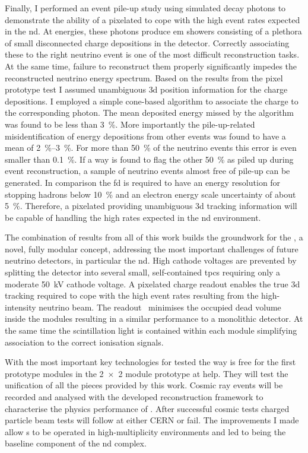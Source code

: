 Finally, I performed an event pile-up study using simulated \Pgpz decay photons to demonstrate the ability of a pixelated \lartpc{} to cope with the high event rates expected in the \dune{} \gls{nd}.
At \dune{} energies, these photons produce \gls{em} showers consisting of a plethora of small disconnected charge depositions in the detector.
Correctly associating these to the right neutrino event is one of the most difficult reconstruction tasks.
At the same time, failure to reconstruct them properly significantly impedes the reconstructed neutrino energy spectrum.
Based on the results from the pixel prototype test I assumed unambiguous \gls{3d} position information for the charge depositions.
I employed a simple cone-based algorithm to associate the charge to the corresponding photon.
The mean deposited energy missed by the algorithm was found to be less than \SI{3}{\percent}.
More importantly the pile-up-related misidentification of energy depositions from other events was found to have a mean of \SIrange{2}{3}{\percent}.
For more than \SI{50}{\percent} of the neutrino events this error is even smaller than \SI{0.1}{\percent}.
If a way is found to flag the other \SI{50}{\percent} as piled up during event reconstruction, a sample of neutrino events almost free of pile-up can be generated.
In comparison the \gls{fd} is required to have an energy resolution for stopping hadrons below \SI{10}{\percent} and an electron energy scale uncertainty of about \SI{5}{\percent}.
Therefore, a pixelated \lartpc{} providing unambiguous \gls{3d} tracking information will be capable of handling the high rates expected in the \dune{} \gls{nd} environment.

The combination of results from all of this work builds the groundwork for the \AC{}, a novel, fully modular \lartpc{} concept, addressing the most important challenges of future neutrino detectors, in particular the \dune{} \gls{nd}.
High cathode voltages are prevented by splitting the detector into several small, self-contained \glspl{tpc} requiring only a moderate \SI{50}{\kilo\volt} cathode voltage.
A pixelated charge readout enables the true \gls{3d} tracking required to cope with the high event rates resulting from the high-intensity neutrino beam.
The \AL{} readout~\cite{arclight} minimises the occupied dead volume inside the modules resulting in a similar performance to a monolithic detector.
At the same time the scintillation light is contained within each module simplifying association to the correct ionisation signals.

With the most important key technologies for \AC{} tested the way is free for the first prototype modules in the \num{2 x 2} module prototype at \gls{help}.
They will test the unification of all the pieces provided by this work.
Cosmic ray events will be recorded and analysed with the developed reconstruction framework to characterise the physics performance of \AC{}.
After successful cosmic tests charged particle beam tests will follow at either CERN or \gls{fail}.
The improvements I made allow \lartpc{}s to be operated in high-multiplicity environments and led to \AC{} being the baseline \lar{} component of the \dune{} \gls{nd} complex.